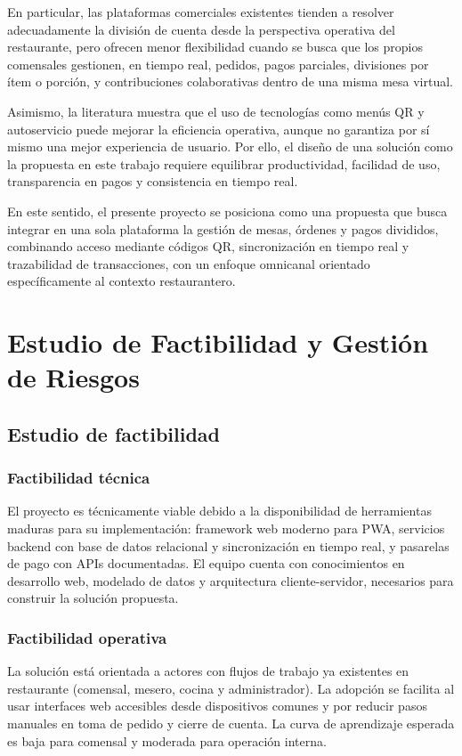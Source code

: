 \documentclass[12pt]{report}
\begin{document}
En particular, las plataformas comerciales existentes tienden a resolver adecuadamente la división de cuenta desde la perspectiva operativa del restaurante, pero ofrecen menor flexibilidad cuando se busca que los propios comensales gestionen, en tiempo real, pedidos, pagos parciales, divisiones por ítem o porción, y contribuciones colaborativas dentro de una misma mesa virtual.

Asimismo, la literatura muestra que el uso de tecnologías como menús QR y autoservicio puede mejorar la eficiencia operativa, aunque no garantiza por sí mismo una mejor experiencia de usuario. Por ello, el diseño de una solución como la propuesta en este trabajo requiere equilibrar productividad, facilidad de uso, transparencia en pagos y consistencia en tiempo real.

En este sentido, el presente proyecto se posiciona como una propuesta que busca integrar en una sola plataforma la gestión de mesas, órdenes y pagos divididos, combinando acceso mediante códigos QR, sincronización en tiempo real y trazabilidad de transacciones, con un enfoque omnicanal orientado específicamente al contexto restaurantero.

\chapter{Estudio de Factibilidad y Gestión de Riesgos}
\section{Estudio de factibilidad}

\subsection{Factibilidad técnica}
El proyecto es técnicamente viable debido a la disponibilidad de herramientas maduras para su implementación: framework web moderno para PWA, servicios backend con base de datos relacional y sincronización en tiempo real, y pasarelas de pago con APIs documentadas. El equipo cuenta con conocimientos en desarrollo web, modelado de datos y arquitectura cliente-servidor, necesarios para construir la solución propuesta.

\subsection{Factibilidad operativa}
La solución está orientada a actores con flujos de trabajo ya existentes en restaurante (comensal, mesero, cocina y administrador). La adopción se facilita al usar interfaces web accesibles desde dispositivos comunes y por reducir pasos manuales en toma de pedido y cierre de cuenta. La curva de aprendizaje esperada es baja para comensal y moderada para operación interna.
\end{document}
